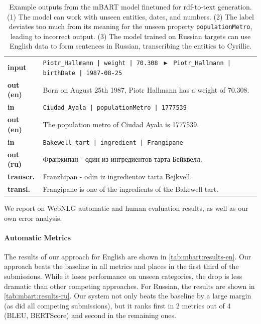 \begin{table}[t]
    \footnotesize
    \centering
    \begin{tabular}{@{}lp{12.7cm}@{}}
        \textbf{input}    & \texttt{Piotr\_Hallmann | weight | 70.308 }  $\blacktriangleright$ \texttt{ Piotr\_Hallmann | birthDate | 1987-08-25} \\
        \textbf{out (en)} & Born on August 25th 1987, Piotr Hallmann has a weight of 70.308.                                                      \\
        \midrule
        \textbf{in}       & \texttt{Ciudad\_Ayala | populationMetro | 1777539}                                                                    \\
        \textbf{out (en)} & The population metro of Ciudad Ayala is 1777539.                                                                      \\
        \midrule
        \textbf{in}       & \texttt{Bakewell\_tart | ingredient | Frangipane}                                                                     \\
        \textbf{out (ru)} & Франжипан - один из ингредиентов тарта Бейквелл.                                                                      \\[0.1cm]
        \textbf{transcr.} & Franzhipan - odin iz ingredientov tarta Bejkvell.                                                                     \\
        \textbf{transl.}  & Frangipane is one of the ingredients of the Bakewell tart.                                                            \\
    \end{tabular}
    \caption[Example outputs from the mBART model.]{Example outputs from the mBART model finetuned for \ac{rdf}-to-text generation. (1) The model can work with unseen entities, dates, and numbers. (2) The label deviates too much from its meaning for the unseen property \texttt{populationMetro}, leading to incorrect output. (3) The model trained on Russian targets can use English data to form sentences in Russian, transcribing the entities to Cyrillic.}
    \label{tab:mbart:examples}
\end{table}

We report on WebNLG automatic and human evaluation results, as well as our own error analysis.

\paragraph{Automatic Metrics}
The results of our approach for English are shown in \autoref{tab:mbart:results-en}. Our approach beats the baseline in all metrics and places in the first third of the submissions. While it loses performance on unseen categories, the drop is less dramatic than other competing approaches. For Russian, the results are shown in \autoref{tab:mbart:results-ru}. Our system not only beats the baseline by a large margin (as did all competing submissions), but it ranks first in 2 metrics out of 4 (BLEU, BERTScore) and second in the remaining ones.


